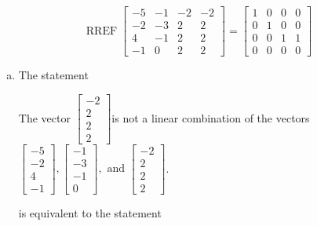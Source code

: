 \begin{exerciseAnswer} 
\[\operatorname{RREF}  \left[\begin{array}{ccc|c}
-5 & -1 & -2 & -2 \\
-2 & -3 & 2 & 2 \\
4 & -1 & 2 & 2 \\
-1 & 0 & 2 & 2
\end{array}\right] = \left[\begin{array}{ccc|c}
1 & 0 & 0 & 0 \\
0 & 1 & 0 & 0 \\
0 & 0 & 1 & 1 \\
0 & 0 & 0 & 0
\end{array}\right] \]
\begin{enumerate}[(a)]
\item  The statement 
\begin{center}\begin{minipage}{0.8\textwidth}
 The vector \( \left[\begin{array}{c}
-2 \\
2 \\
2 \\
2
\end{array}\right] \)is not a linear combination of the vectors \( \left[\begin{array}{c}
-5 \\
-2 \\
4 \\
-1
\end{array}\right] , \left[\begin{array}{c}
-1 \\
-3 \\
-1 \\
0
\end{array}\right] , \text{ and } \left[\begin{array}{c}
-2 \\
2 \\
2 \\
2
\end{array}\right] \). 
\end{minipage}\end{center}
     is equivalent to the statement 
\begin{center}\begin{minipage}{0.8\textwidth}
 The vector equation \( x_{1} \left[\begin{array}{c}
-5 \\
-2 \\
4 \\

\end{array}
\end{minipage}
\end{center}
\end{enumerate}
\end{exerciseAnswer}
